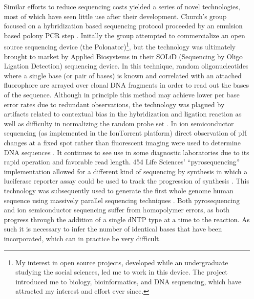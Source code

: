 Similar efforts to reduce sequencing costs yielded a series of novel technologies, most of which have seen little use after their development.
Church's group focused on a hybridization based sequencing protocol proceeded by an emulsion based polony PCR step \cite{shendure2005accurate}.
Initally the group attempted to commercialize an open source sequencing device (the Polonator)\footnote{My interest in open source projects, developed while an undergraduate studying the social sciences, led me to work in this device. The project introduced me to biology, bioinformatics, and DNA sequencing, which have attracted my interest and effort ever since.}, but the technology was ultimately brought to market by Applied Biosystems in their SOLiD (Sequencing by Oligo Ligation Detection) sequencing device.
In this technique, random oligonucleotides where a single base (or pair of bases) is known and correlated with an attached fluorophore are arrayed over clonal DNA fragments in order to read out the bases of the sequence.
Although in principle this method may achieve lower per base error rates due to redundant observations, the technology was plagued by artifacts related to contextual bias in the hybridization and ligation reaction as well as difficulty in normalizing the random probe set \cite{challis2015distribution}.
In ion semiconductor sequencing (as implemented in the IonTorrent platform) direct observation of pH changes at a fixed spot rather than fluorescent imaging were used to determine DNA sequences \cite{rusk2010torrents}.
It continues to see use in some diagnostic laboratories due to its rapid operation and favorable read length.
454 Life Sciences' ``pyrosequencing'' implementation allowed for a different kind of sequencing by synthesis in which a luciferase reporter assay could be used to track the progression of synthesis \cite{margulies2005genome}.
This technology was subsequently used to generate the first whole genome human sequence using massively parallel sequencing techniques \cite{wheeler2008complete}.
Both pyrosequencing and ion semiconductor sequencing suffer from homopolymer errors, as both progress through the addition of a single dNTP type at a time to the reaction.
As such it is necessary to infer the number of identical bases that have been incorporated, which can in practice be very difficult.

